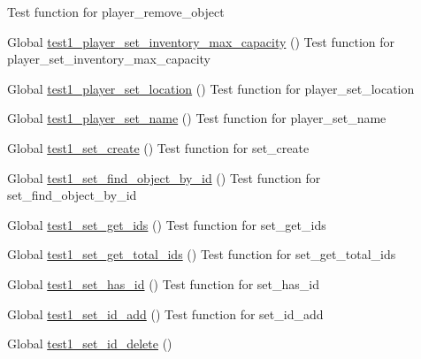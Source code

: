 \begin{DoxyRefList}
Test function for player\+\_\+remove\+\_\+object  
\item[Global \mbox{\hyperlink{player__test_8h_aed1d8026a0c56c42a1a9d89b887a5e4d}{test1\+\_\+player\+\_\+set\+\_\+inventory\+\_\+max\+\_\+capacity}} ()]\label{test__test000081}%
%
Test function for player\+\_\+set\+\_\+inventory\+\_\+max\+\_\+capacity  
\item[Global \mbox{\hyperlink{player__test_8h_aec6799a4f46c3f3c471fcb668addcad4}{test1\+\_\+player\+\_\+set\+\_\+location}} ()]\label{test__test000071}%
%
Test function for player\+\_\+set\+\_\+location  
\item[Global \mbox{\hyperlink{player__test_8h_a9d87c09e6af910d695265e3fd77ae3a2}{test1\+\_\+player\+\_\+set\+\_\+name}} ()]\label{test__test000055}%
%
Test function for player\+\_\+set\+\_\+name  
\item[Global \mbox{\hyperlink{set__test_8h_a6f654ab4b44e8a9b9cedfb78c378a5d7}{test1\+\_\+set\+\_\+create}} ()]\label{test__test000087}%
%
Test function for set\+\_\+create  
\item[Global \mbox{\hyperlink{set__test_8h_a4e1cb4b064b88a074cc4e144827d03dd}{test1\+\_\+set\+\_\+find\+\_\+object\+\_\+by\+\_\+id}} ()]\label{test__test000106}%
%
Test function for set\+\_\+find\+\_\+object\+\_\+by\+\_\+id  
\item[Global \mbox{\hyperlink{set__test_8h_a5121f8a96087a7f941ffb785d3f826c9}{test1\+\_\+set\+\_\+get\+\_\+ids}} ()]\label{test__test000120}%
%
Test function for set\+\_\+get\+\_\+ids  
\item[Global \mbox{\hyperlink{set__test_8h_a31f1c6b37046c1c8d8fc6175ce78f175}{test1\+\_\+set\+\_\+get\+\_\+total\+\_\+ids}} ()]\label{test__test000100}%
%
Test function for set\+\_\+get\+\_\+total\+\_\+ids  
\item[Global \mbox{\hyperlink{set__test_8h_affa806cab8e900cc297cc1a58f5ac35c}{test1\+\_\+set\+\_\+has\+\_\+id}} ()]\label{test__test000102}%
%
Test function for set\+\_\+has\+\_\+id  
\item[Global \mbox{\hyperlink{set__test_8h_a49426ad2bfe388add4ae96d3caa8ad82}{test1\+\_\+set\+\_\+id\+\_\+add}} ()]\label{test__test000089}%
%
Test function for set\+\_\+id\+\_\+add  
\item[Global \mbox{\hyperlink{set__test_8h_a7b258a134d0d34bae43931357c187649}{test1\+\_\+set\+\_\+id\+\_\+delete}} ()]\label{test__test000093}%

\end{DoxyRefList}
